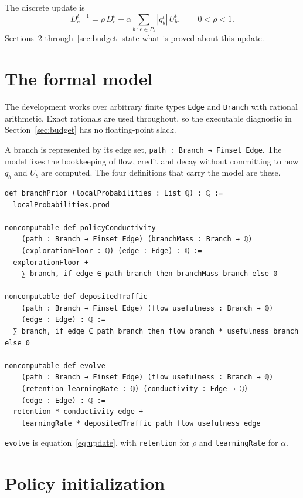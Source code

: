 \documentclass[11pt,a4paper]{article}
\theoremstyle{definition}
\newcommand{\lean}[1]{\texttt{#1}}
\begin{document}
The discrete update is
\begin{equation}
  D_e^{t+1} = \rho\, D_e^{t}
  + \alpha \sum_{b \,:\, e \in P_b} |q_b^{t}| \, U_b^{t},
  \qquad 0 < \rho < 1 .
  \label{eq:update}
\end{equation}
Sections~\ref{sec:init} through~\ref{sec:budget} state what is proved about
this update.

\section{The formal model}

The development works over arbitrary finite types \lean{Edge} and \lean{Branch}
with rational arithmetic. Exact rationals are used throughout, so the
executable diagnostic in Section~\ref{sec:budget} has no floating-point slack.

A branch is represented by its edge set, \lean{path : Branch → Finset Edge}.
The model fixes the bookkeeping of flow, credit and decay without committing to
how $q_b$ and $U_b$ are computed. The four definitions that carry the model are
these.

\begin{Verbatim}[fontsize=\small,xleftmargin=1em]
def branchPrior (localProbabilities : List ℚ) : ℚ :=
  localProbabilities.prod

noncomputable def policyConductivity
    (path : Branch → Finset Edge) (branchMass : Branch → ℚ)
    (explorationFloor : ℚ) (edge : Edge) : ℚ :=
  explorationFloor +
    ∑ branch, if edge ∈ path branch then branchMass branch else 0

noncomputable def depositedTraffic
    (path : Branch → Finset Edge) (flow usefulness : Branch → ℚ)
    (edge : Edge) : ℚ :=
  ∑ branch, if edge ∈ path branch then flow branch * usefulness branch else 0

noncomputable def evolve
    (path : Branch → Finset Edge) (flow usefulness : Branch → ℚ)
    (retention learningRate : ℚ) (conductivity : Edge → ℚ)
    (edge : Edge) : ℚ :=
  retention * conductivity edge +
    learningRate * depositedTraffic path flow usefulness edge
\end{Verbatim}

\lean{evolve} is equation~\eqref{eq:update}, with \lean{retention} for $\rho$
and \lean{learningRate} for $\alpha$.

\section{Policy initialization}
\label{sec:init}
\end{document}
